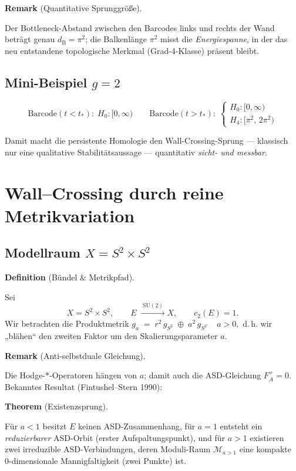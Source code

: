 \documentclass[10pt, letterpaper]{article}
\newcommand{\CustomHeading}[3]{%
  \par\medskip\noindent%
  \textbf{#1 #2} \textnormal{(#3)}.\enskip%
}
\newenvironment{DEF}[2]{\CustomHeading{Definition}{#1}{#2}}{}
\newenvironment{THEO}[2]{\CustomHeading{Theorem}{#1}{#2}}{}
\newenvironment{REM}[2]{\CustomHeading{Remark}{#1}{#2}}{}
\begin{document}
\begin{REM}{}{Quantitative Sprunggröße}
  Der Bottleneck-Abstand zwischen den Barcodes links und rechts der Wand
  beträgt genau
  \(\displaystyle d_{\mathrm B}=\pi^{2}\);  
  die Balkenlänge \(\pi^{2}\) misst die \emph{Energiespanne}, in der das neu
  entstandene topologische Merkmal (Grad-4-Klasse) präsent bleibt.
\end{REM}

\subsection{Mini-Beispiel \(g=2\)}

\[
  \text{Barcode}(t<t_\ast):\;
    H_0 : [0,\infty)
  \quad\quad
  \text{Barcode}(t>t_\ast):\;
    \begin{cases}
      H_0 : [0,\infty)\\[2pt]
      H_4 : [\pi^{2},\,2\pi^{2})
    \end{cases}
\]

Damit macht die persistente Homologie den Wall-Crossing-Sprung — klassisch nur eine qualitative Stabilitätsaussage — quantitativ \emph{sicht- und messbar}.

\section{Wall--Crossing durch reine Metrikvariation}

\subsection{Modellraum \(X=S^2\times S^2\)}

\begin{DEF}{}{Bündel \& Metrikpfad}
  Sei
  \[
    X=S^2\times S^2,
    \qquad
    E\;\xrightarrow{\;\mathrm{SU}(2)\;} X,
    \qquad
    c_2(E)=1 .
  \]
  Wir betrachten die Produktmetrik
  \(
      g_a \;=\; r^2\,g_{S^2}\;\oplus\;a^2\,g_{S^{2'}}
      \quad a>0,
  \)
  d.\,h. wir „blähen“ den zweiten Faktor um den Skalierungsparameter \(a\).
\end{DEF}

\REM{}{Anti-selbstduale Gleichung}
Die Hodge-\(*\)-Operatoren hängen von \(a\); damit auch die
ASD-Gleichung \(F_A^+=0\).
Bekanntes Resultat (Fintushel–Stern 1990):

\begin{THEO}{}{Existenzsprung}
  Für \(a<1\) besitzt \(E\) keinen ASD-Zusammenhang,
  für \(a=1\) entsteht ein \emph{reduzierbarer} ASD-Orbit
  (erster Aufspaltungspunkt),
  und für \(a>1\) existieren zwei irreduzible ASD-Verbindungen,
  deren Moduli-Raum \(\mathcal M_{a>1}\) eine kompakte
  0-dimensionale Mannigfaltigkeit (zwei Punkte) ist.
\end{THEO}
\end{document}
